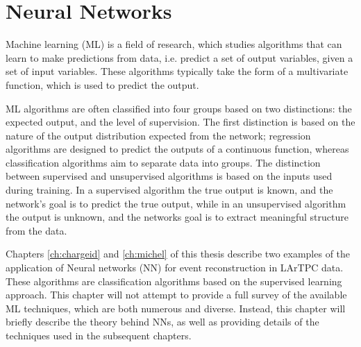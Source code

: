\chapter{\label{ch:ml}Neural Networks} 

\minitoc

Machine learning (ML) is a field of research, which studies algorithms that
can learn to make predictions from data, i.e. predict a set of output variables,
given a set of input variables. These algorithms typically take the form of a
multivariate function, which is used to predict the output\cite{Reed1999}.

ML algorithms are often classified into four groups based on two distinctions:
the expected output, and the level of supervision. The first distinction is 
based on the nature of the output distribution expected from the network; 
regression algorithms are designed to predict the outputs of a continuous 
function, whereas classification algorithms aim to separate data into groups. 
The distinction between supervised and unsupervised algorithms is based on the 
inputs used during training. In a supervised algorithm the true output is 
known, and the network's goal is to predict the true output, while in an 
unsupervised algorithm the output is unknown, and the networks goal is to 
extract meaningful structure from the data\cite{Lecun2015}.

Chapters \ref{ch:chargeid} and \ref{ch:michel} of this thesis describe two 
examples of the application of Neural networks (NN) for event reconstruction 
in LArTPC data. These algorithms are classification algorithms based on the
supervised learning approach. This chapter will not attempt to provide a full 
survey of the available ML techniques, which are both numerous and diverse. 
Instead, this chapter will briefly describe the theory behind NNs, as well as 
providing details of the techniques used in the subsequent chapters. 

